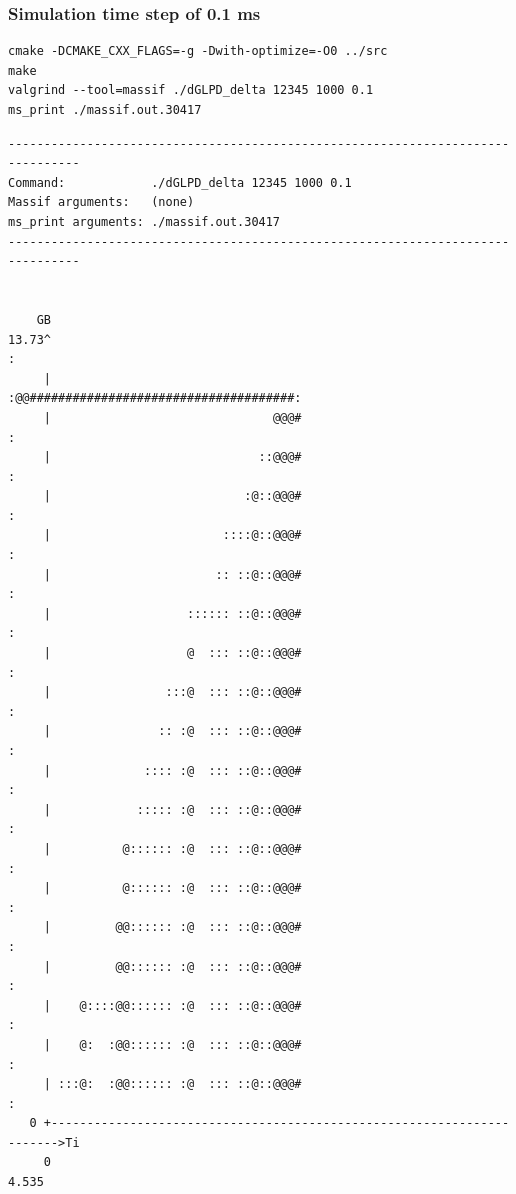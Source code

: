 \documentclass[11pt]{scrartcl}
\begin{document}
\subsubsection{Simulation time step of 0.1 ms}
\label{sec:orgeb40b36}

\begin{verbatim}
cmake -DCMAKE_CXX_FLAGS=-g -Dwith-optimize=-O0 ../src
make
valgrind --tool=massif ./dGLPD_delta 12345 1000 0.1
ms_print ./massif.out.30417
\end{verbatim}

\begin{verbatim}
--------------------------------------------------------------------------------
Command:            ./dGLPD_delta 12345 1000 0.1
Massif arguments:   (none)
ms_print arguments: ./massif.out.30417
--------------------------------------------------------------------------------


    GB
13.73^                                                                       :
     |                               :@@#####################################:
     |                               @@@#                                    :
     |                             ::@@@#                                    :
     |                           :@::@@@#                                    :
     |                        ::::@::@@@#                                    :
     |                       :: ::@::@@@#                                    :
     |                   :::::: ::@::@@@#                                    :
     |                   @  ::: ::@::@@@#                                    :
     |                :::@  ::: ::@::@@@#                                    :
     |               :: :@  ::: ::@::@@@#                                    :
     |             :::: :@  ::: ::@::@@@#                                    :
     |            ::::: :@  ::: ::@::@@@#                                    :
     |          @:::::: :@  ::: ::@::@@@#                                    :
     |          @:::::: :@  ::: ::@::@@@#                                    :
     |         @@:::::: :@  ::: ::@::@@@#                                    :
     |         @@:::::: :@  ::: ::@::@@@#                                    :
     |    @::::@@:::::: :@  ::: ::@::@@@#                                    :
     |    @:  :@@:::::: :@  ::: ::@::@@@#                                    :
     | :::@:  :@@:::::: :@  ::: ::@::@@@#                                    :
   0 +----------------------------------------------------------------------->Ti
     0                                                                   4.535
\end{verbatim}
\end{document}
